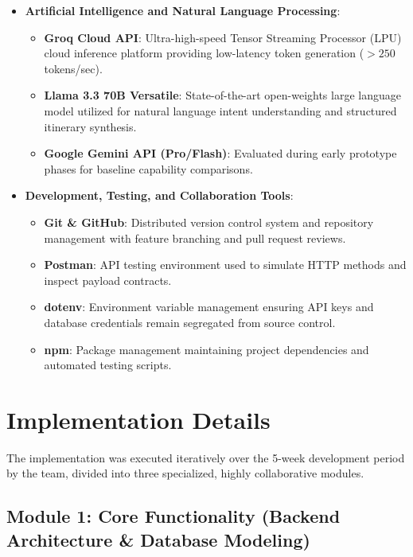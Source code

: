 \documentclass[12pt,a4paper,twoside,openright]{report}
\begin{document}
\begin{itemize}[leftmargin=*]
    \item \textbf{Artificial Intelligence and Natural Language Processing}:
    \begin{itemize}
        \item \textbf{Groq Cloud API}: Ultra-high-speed Tensor Streaming Processor (LPU) cloud inference platform providing low-latency token generation ($>250$\,tokens/sec).
        \item \textbf{Llama 3.3 70B Versatile}: State-of-the-art open-weights large language model utilized for natural language intent understanding and structured itinerary synthesis.
        \item \textbf{Google Gemini API (Pro/Flash)}: Evaluated during early prototype phases for baseline capability comparisons.
    \end{itemize}

    \item \textbf{Development, Testing, and Collaboration Tools}:
    \begin{itemize}
        \item \textbf{Git \& GitHub}: Distributed version control system and repository management with feature branching and pull request reviews.
        \item \textbf{Postman}: API testing environment used to simulate HTTP methods and inspect payload contracts.
        \item \textbf{dotenv}: Environment variable management ensuring API keys and database credentials remain segregated from source control.
        \item \textbf{npm}: Package management maintaining project dependencies and automated testing scripts.
    \end{itemize}
\end{itemize}

\section{Implementation Details}

The implementation was executed iteratively over the 5-week development period by the team, divided into three specialized, highly collaborative modules.

\subsection{Module 1: Core Functionality (Backend Architecture \& Database Modeling)}
\end{document}
